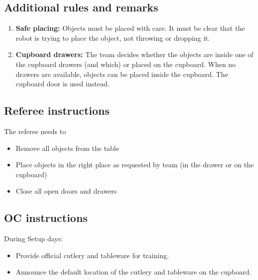 \subsection{Additional rules and remarks}
\begin{enumerate}[nosep]
	\item \textbf{Safe placing:} Objects must be placed with care. It must be clear that the robot is trying to place the object, not throwing or dropping it.

	\item \textbf{Cupboard drawers:} The team decides whether the objects are inside one of the cupboard drawers (and which) or placed on the cupboard.
	When no drawers are available, objects can be placed inside the cupboard. The cupboard door is used instead.

\end{enumerate}

\subsection{Referee instructions}

The referee needs to
\begin{itemize}
	\item Remove all objects from the table
	\item Place objects in the right place as requested by team (in the drawer or on the cupboard)
	\item Close all open doors and drawers
\end{itemize}

\subsection{OC instructions}
During Setup days:
\begin{itemize}
	\item Provide official cutlery and tableware for training.
	\item Announce the default location of the cutlery and tableware on the cupboard.
\end{itemize}


% 



